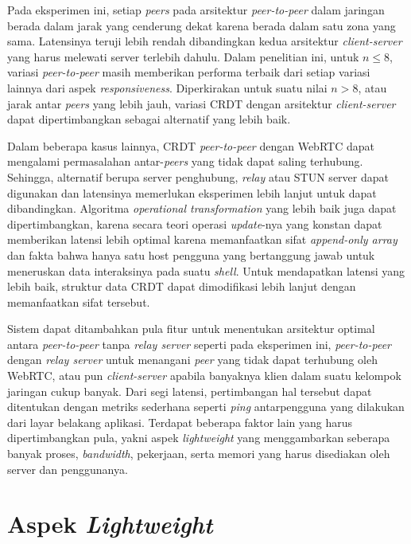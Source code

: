 Pada eksperimen ini, setiap \textit{peers} pada arsitektur \textit{peer-to-peer} dalam jaringan berada dalam jarak yang cenderung dekat karena berada dalam satu zona yang sama. Latensinya teruji lebih rendah dibandingkan kedua arsitektur \textit{client-server} yang harus melewati server terlebih dahulu. Dalam penelitian ini, untuk $n \leq 8$, variasi \textit{peer-to-peer} masih memberikan performa terbaik dari setiap variasi lainnya dari aspek \textit{responsiveness}. Diperkirakan untuk suatu nilai $n > 8$, atau jarak antar \textit{peers} yang lebih jauh, variasi CRDT dengan arsitektur \textit{client-server} dapat dipertimbangkan sebagai alternatif yang lebih baik.

Dalam beberapa kasus lainnya, CRDT \textit{peer-to-peer} dengan WebRTC dapat mengalami permasalahan antar-\textit{peers} yang tidak dapat saling terhubung. Sehingga, alternatif berupa server penghubung, \textit{relay} atau STUN server dapat digunakan dan latensinya memerlukan eksperimen lebih lanjut untuk dapat dibandingkan. Algoritma \textit{operational transformation} yang lebih baik juga dapat dipertimbangkan, karena secara teori operasi \textit{update}-nya yang konstan dapat memberikan latensi lebih optimal karena memanfaatkan sifat \textit{append-only array} dan fakta bahwa hanya satu host pengguna yang bertanggung jawab untuk meneruskan data interaksinya pada suatu \textit{shell}. Untuk mendapatkan latensi yang lebih baik, struktur data CRDT dapat dimodifikasi lebih lanjut dengan memanfaatkan sifat tersebut.

Sistem dapat ditambahkan pula fitur untuk menentukan arsitektur optimal antara \textit{peer-to-peer} tanpa \textit{relay server} seperti pada eksperimen ini, \textit{peer-to-peer} dengan \textit{relay server} untuk menangani \textit{peer} yang tidak dapat terhubung oleh WebRTC, atau pun \textit{client-server} apabila banyaknya klien dalam suatu kelompok jaringan cukup banyak. Dari segi latensi, pertimbangan hal tersebut dapat ditentukan dengan metriks sederhana seperti \textit{ping} antarpengguna yang dilakukan dari layar belakang aplikasi. Terdapat beberapa faktor lain yang harus dipertimbangkan pula, yakni aspek \textit{lightweight} yang menggambarkan seberapa banyak proses, \textit{bandwidth}, pekerjaan, serta memori yang harus disediakan oleh server dan penggunanya.

\section{Aspek \textit{Lightweight}}

